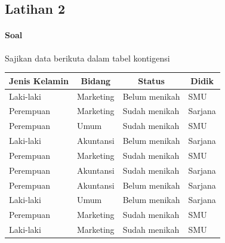 \documentclass[a4paper,12pt]{article}
\begin{document}
\subsection{Latihan 2}
\paragraph{Soal\\}
Sajikan data berikuta dalam tabel kontigensi
\begin{table}[!ht]
	\begin{tabular}{|l|l|l|l|}
		\hline
		\multicolumn{1}{|c|}{Jenis Kelamin} & \multicolumn{1}{c|}{Bidang} & \multicolumn{1}{c|}{Status} & \multicolumn{1}{c|}{Didik} \\ \hline
		Laki-laki                           & Marketing                   & Belum menikah               & SMU                        \\ \hline
		Perempuan                           & Marketing                   & Sudah menikah               & Sarjana                    \\ \hline
		Perempuan                           & Umum                        & Sudah menikah               & SMU                        \\ \hline
		Laki-laki                           & Akuntansi                   & Belum menikah               & Sarjana                    \\ \hline
		Perempuan                           & Marketing                   & Sudah menikah               & SMU                        \\ \hline
		Perempuan                           & Akuntansi                   & Sudah menikah               & Sarjana                    \\ \hline
		Perempuan                           & Akuntansi                   & Belum menikah               & Sarjana                    \\ \hline
		Laki-laki                           & Umum                        & Belum menikah               & Sarjana                    \\ \hline
		Perempuan                           & Marketing                   & Sudah menikah               & SMU                        \\ \hline
		Laki-laki                           & Marketing                   & Sudah menikah               & SMU                        \\ \hline
	\end{tabular}
\end{table}
\end{document}

